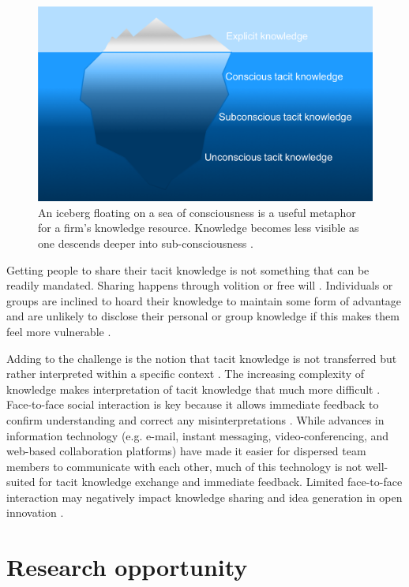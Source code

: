 \begin{figure}
    \centering
    \includegraphics[width=0.7\linewidth]{Images/iceberg.png}
    \caption{An iceberg floating on a sea of consciousness is a useful metaphor for a firm's knowledge resource. Knowledge becomes less visible as one descends deeper into sub-consciousness \citep{haldin2000difficulties}.}
    \label{fig:iceberg}
\end{figure}

Getting people to share their tacit knowledge is not something that can be readily mandated. Sharing happens through volition or free will \citep{polanyi1966tacit}. Individuals or groups are inclined to hoard their knowledge to maintain some form of advantage and are unlikely to disclose their personal or group knowledge if this makes them feel more vulnerable  \citep{levin2004strength,riege2005three,lin2007share,milne2007motivation}. \medskip

Adding to the challenge is the notion that tacit knowledge is not transferred but rather interpreted within a specific context \citep{nonaka1995knowledge,duguid2005art,marabelli2014knowing}. The increasing complexity of knowledge makes interpretation of tacit knowledge that much more difficult \citep{eraut2000non}. Face\hyp{}to\hyp{}face social interaction is key because it allows immediate feedback to confirm understanding and correct any misinterpretations \citep{haldin2000difficulties,gertler2003tacit,koskinen2003tacit}. While advances in information technology (e.g. e\hyp{}mail, instant messaging, video\hyp{}conferencing, and web\hyp{}based collaboration platforms) have made it easier for dispersed team members to communicate with each other, much of this technology is not well-suited for tacit knowledge exchange and immediate feedback. Limited face\hyp{}to\hyp{}face interaction may negatively impact knowledge sharing and idea generation in open innovation \citep{johannessen2001mismanagement}. \medskip

\section{Research opportunity}

